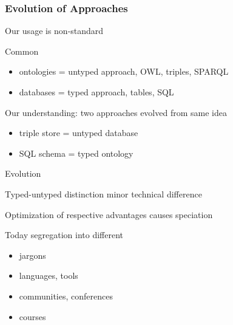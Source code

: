 \documentclass{beamer}
\begin{document}
\begin{frame}\frametitle{Evolution of Approaches}
\begin{blockitems}{Our usage is non-standard}
 \item Common
  \begin{itemize}
  \item ontologies = untyped approach, OWL, triples,  SPARQL
  \item databases = typed approach, tables, SQL
  \end{itemize}
 \item Our understanding: two approaches evolved from same idea
	\begin{itemize}
	\item triple store = untyped database
	\item SQL schema = typed ontology
	\end{itemize}
\end{blockitems}

\begin{blockitems}{Evolution}
\item Typed-untyped distinction minor technical difference
\item Optimization of respective advantages causes speciation
\item Today segregation into different
 \begin{itemize}
 \item jargons
 \item languages, tools
 \item communities, conferences
 \item courses
 \end{itemize}
\end{blockitems}
\end{frame}
\end{document}
